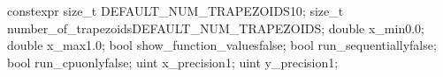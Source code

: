 \begin{cppcode*}{}
constexpr size_t DEFAULT_NUM_TRAPEZOIDS{10};
size_t number_of_trapezoids{DEFAULT_NUM_TRAPEZOIDS};
double x_min{0.0};
double x_max{1.0};
bool show_function_values{false};
bool run_sequentially{false};
bool run_cpuonly{false};
uint x_precision{1};
uint y_precision{1};
\end{cppcode*}

